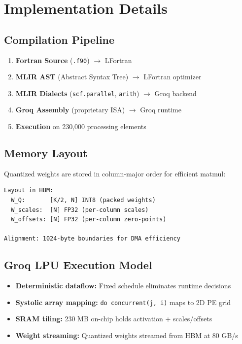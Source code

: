 \documentclass[10pt]{article}
\begin{document}
\section{Implementation Details}

\subsection{Compilation Pipeline}

\begin{enumerate}
\item \textbf{Fortran Source} (\texttt{.f90}) $\rightarrow$ LFortran
\item \textbf{MLIR AST} (Abstract Syntax Tree) $\rightarrow$ LFortran optimizer
\item \textbf{MLIR Dialects} (\texttt{scf.parallel}, \texttt{arith}) $\rightarrow$ Groq backend
\item \textbf{Groq Assembly} (proprietary ISA) $\rightarrow$ Groq runtime
\item \textbf{Execution} on 230,000 processing elements
\end{enumerate}

\subsection{Memory Layout}

Quantized weights are stored in column-major order for efficient matmul:

\begin{verbatim}
Layout in HBM:
  W_Q:       [K/2, N] INT8 (packed weights)
  W_scales:  [N] FP32 (per-column scales)
  W_offsets: [N] FP32 (per-column zero-points)

Alignment: 1024-byte boundaries for DMA efficiency
\end{verbatim}

\subsection{Groq LPU Execution Model}

\begin{itemize}
\item \textbf{Deterministic dataflow:} Fixed schedule eliminates runtime decisions
\item \textbf{Systolic array mapping:} \texttt{do concurrent(j, i)} maps to 2D PE grid
\item \textbf{SRAM tiling:} 230 MB on-chip holds activation + scales/offsets
\item \textbf{Weight streaming:} Quantized weights streamed from HBM at 80 GB/s
\end{itemize}
\end{document}
